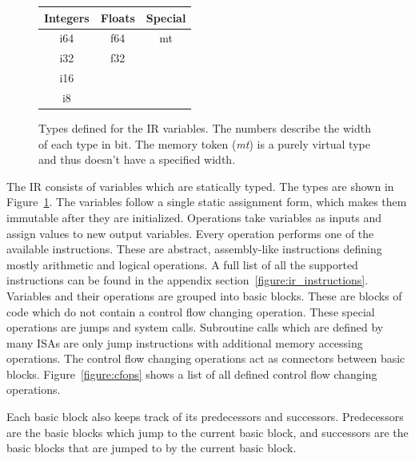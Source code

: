 \documentclass[course=eragp]{aspdoc}
\begin{document}
\begin{figure}[H]
    \begin{center}
        \begin{tabular}{|c | c | c|}
            \hline
            Integers & Floats & Special \\ [0.5ex]
            \hline\hline
            i64      & f64    & mt      \\
            \hline
            i32      & f32    &         \\
            \hline
            i16      &        &         \\
            \hline
            i8       &        &         \\
            \hline
        \end{tabular}
        \caption{Types defined for the IR variables. The numbers describe the width of each type in bit. The
            memory token (\textit{mt}) is a purely virtual type and thus doesn't have a specified width.}\label{ir:types:figure}
    \end{center}
\end{figure}


The IR consists of variables which are statically typed. The types are shown in
Figure~\ref{ir:types:figure}. The variables follow a single static assignment form, which makes them
immutable after they are initialized. Operations take variables as inputs and assign values to
new output variables. Every operation performs one of the available instructions. These are abstract,
assembly-like instructions defining mostly arithmetic and logical operations. A full list of all the
supported instructions can be found in the appendix section~\ref{figure:ir_instructions}.
Variables and their operations are grouped into basic blocks. These are blocks of code
which do not contain a control flow changing operation. These special operations are jumps and
system calls. Subroutine calls which are defined by many ISAs are only jump instructions with
additional memory accessing operations. The control flow changing operations act as connectors
between basic blocks. Figure~\ref{figure:cfops} shows a list of all defined control flow changing operations.

Each basic block also keeps track of its predecessors and successors. Predecessors are the basic blocks which jump to
the current basic block, and successors are the basic blocks that are jumped to by the current basic block.
\end{document}
